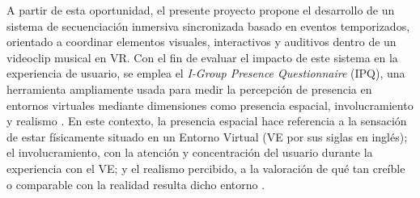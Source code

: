 A partir de esta oportunidad, el presente proyecto propone el desarrollo de un sistema de secuenciación inmersiva sincronizada basado en eventos temporizados, orientado a coordinar elementos visuales, interactivos y auditivos dentro de un videoclip musical en VR. Con el fin de evaluar el impacto de este sistema en la experiencia de usuario, se emplea el \emph{I-Group Presence Questionnaire} (IPQ), una herramienta ampliamente usada para medir la percepción de presencia en entornos virtuales mediante dimensiones como presencia espacial, involucramiento y realismo \cite{berkman2021igroup}. En este contexto, la presencia espacial hace referencia a la sensación de estar físicamente situado en un Entorno Virtual (VE por sus siglas en inglés); el involucramiento, con la atención y concentración del usuario durante la experiencia con el VE; y el realismo percibido, a la valoración de qué tan creíble o comparable con la realidad resulta dicho entorno \cite{castro2026immersive}.
